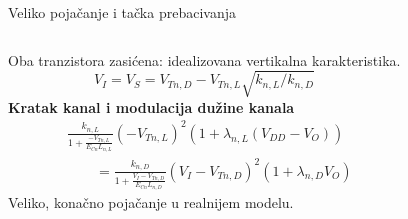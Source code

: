 \begin{frame}[label=09_2-s006]{Veliko pojačanje i tačka prebacivanja}
\begin{columns}[T,onlytextwidth]\centering {}Oba tranzistora zasićena: idealizovana vertikalna karakteristika.
\[V_I=V_S=V_{Tn,D}-V_{Tn,L}\sqrt{k_{n,L}/k_{n,D}}\]
\textbf{Kratak kanal i modulacija dužine kanala}
\[\begin{aligned}
&\frac{k_{n,L}}{1+\frac{-V_{Tn,L}}{E_{Cn}L_{n,L}}}(-V_{Tn,L})^2\left(1+\lambda_{n,L}(V_{DD}-V_O)\right)\\
&\qquad=\frac{k_{n,D}}{1+\frac{V_I-V_{Tn,D}}{E_{Cn}L_{n,D}}}(V_I-V_{Tn,D})^2(1+\lambda_{n,D}V_O)
\end{aligned}\]
Veliko, konačno pojačanje u realnijem modelu.\end{columns}
\end{frame}
